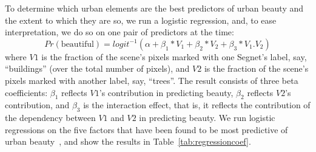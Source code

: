\begin{table}[t!]
	\centering
	\caption{Coefficients of logistic regressions run on one pair of predictors at the time.}
	\label{tab:regressioncoef}
    \vspace{-10mm}
\end{table}


To determine which urban elements are the best predictors of urban beauty and the extent to which they are so, we run a logistic regression, and, to ease interpretation, we do so on one pair of predictors at the time: 
\begin{equation}
Pr(\textrm{beautiful}) = logit^{-1}(\alpha + \beta_1 * V_1 + \beta_2 * V_2  + \beta_3 * V_{1}.V_{2} )
\label{eq:regression} 
\end{equation}
where $V1$ is the fraction of the scene's pixels marked with one Segnet's label, say, ``buildings'' (over the total number of pixels),  and $V2$ is the fraction of the scene's pixels marked with another label, say, ``trees''. The result consists of three beta coefficients: $\beta_1$ reflects $V1$'s contribution in predicting beauty,  $\beta_2$ reflects $V2$'s contribution, and $\beta_3$ is the interaction effect, that is, it reflects the contribution of the dependency between $V1$ and $V2$ in predicting beauty. We run logistic regressions on the five factors that have been found to be most predictive of urban beauty~\cite{quercia2014aesthetic, ewing2013measuring, alexander1977pattern}, and show the results in Table~\ref{tab:regressioncoef}.


